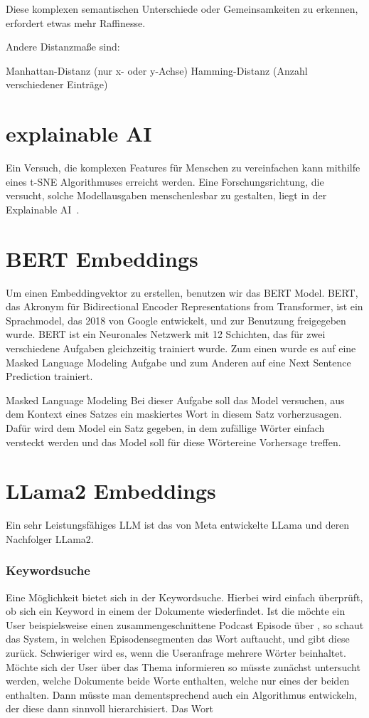 Diese komplexen semantischen Unterschiede oder Gemeinsamkeiten zu erkennen, erfordert etwas mehr Raffinesse.

Andere Distanzmaße sind:

Manhattan-Distanz (nur x- oder y-Achse)
Hamming-Distanz (Anzahl verschiedener Einträge)

\section{explainable AI}
Ein Versuch, die komplexen Features für Menschen zu vereinfachen kann mithilfe eines t-SNE Algorithmuses erreicht werden.
Eine Forschungsrichtung, die versucht, solche Modellausgaben menschenlesbar zu gestalten, liegt in der Explainable AI~\cite{hassija2024}.

\section{BERT Embeddings}

Um einen Embeddingvektor zu erstellen, benutzen wir das BERT Model. BERT, das Akronym für Bidirectional Encoder Representations from Transformer, ist ein Sprachmodel, das 2018 von Google entwickelt, und zur Benutzung freigegeben wurde. 
BERT ist ein Neuronales Netzwerk mit 12 Schichten, das für zwei verschiedene Aufgaben gleichzeitig trainiert wurde. Zum einen wurde es auf eine Masked Language Modeling Aufgabe und zum Anderen auf eine Next Sentence Prediction trainiert. 

Masked Language Modeling
Bei dieser Aufgabe soll das Model versuchen, aus dem Kontext eines Satzes ein maskiertes Wort in diesem Satz vorherzusagen. Dafür wird dem Model ein Satz gegeben, in dem zufällige Wörter einfach versteckt werden und das Model soll für diese Wörtereine Vorhersage treffen.

\section{LLama2 Embeddings}

Ein sehr Leistungsfähiges LLM ist das von Meta entwickelte LLama und deren Nachfolger LLama2. \cite{touvron2023}

\subsubsection{Keywordsuche}

Eine Möglichkeit bietet sich in der Keywordsuche. 
Hierbei wird einfach überprüft, ob sich ein Keyword in einem der Dokumente wiederfindet. Ist die möchte ein User beispielsweise einen zusammengeschnittene Podcast Episode über , so schaut das System, in welchen Episodensegmenten das Wort  auftaucht, und gibt diese zurück. 
Schwieriger wird es, wenn die Useranfrage mehrere Wörter beinhaltet. 
Möchte sich der User über das Thema  informieren so müsste zunächst untersucht werden, welche Dokumente beide Worte enthalten, welche nur eines der beiden enthalten. 
Dann müsste man dementsprechend auch ein Algorithmus entwickeln, der diese dann sinnvoll hierarchisiert. 
Das Wort 

